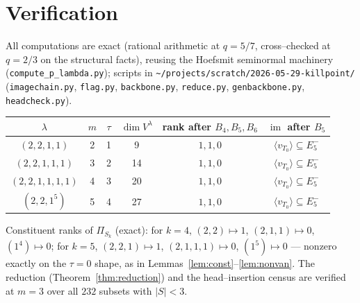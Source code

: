 \documentclass[11pt]{article}
\theoremstyle{definition}
\DeclareMathOperator{\im}{im}
\newcommand{\la}{\lambda}
\newcommand{\Vl}{V^{\la}}
\newcommand{\Em}[1]{E^{-}_{#1}}
\begin{document}
\section{Verification}

All computations are exact (rational arithmetic at $q=5/7$, cross--checked at $q=2/3$ on
the structural facts), reusing the Hoefsmit seminormal machinery
(\texttt{compute\_p\_lambda.py}); scripts in
\texttt{\~{}/projects/scratch/2026-05-29-killpoint/}
(\texttt{imagechain.py}, \texttt{flag.py}, \texttt{backbone.py}, \texttt{reduce.py},
\texttt{genbackbone.py}, \texttt{headcheck.py}).

\begin{center}
\begin{tabular}{c|c|c|c|c|c}
$\la$ & $m$ & $\tau$ & $\dim\Vl$ & rank after $B_4,B_5,B_6$ & $\im$ after $B_5$\\\hline
$(2,2,1,1)$       & 2 & 1 & 9  & $1,1,0$ & $\langle v_{T_0}\rangle\subseteq\Em5$\\
$(2,2,1,1,1)$     & 3 & 2 & 14 & $1,1,0$ & $\langle v_{T_0}\rangle\subseteq\Em5$\\
$(2,2,1,1,1,1)$   & 4 & 3 & 20 & $1,1,0$ & $\langle v_{T_0}\rangle\subseteq\Em5$\\
$(2,2,1^5)$       & 5 & 4 & 27 & $1,1,0$ & $\langle v_{T_0}\rangle\subseteq\Em5$\\
\end{tabular}
\end{center}

\noindent Constituent ranks of $\Pi_{S_k}$ (exact): for $k=4$,
$(2,2)\!\mapsto\!1$, $(2,1,1)\!\mapsto\!0$, $(1^4)\!\mapsto\!0$; for $k=5$,
$(2,2,1)\!\mapsto\!1$, $(2,1,1,1)\!\mapsto\!0$, $(1^5)\!\mapsto\!0$ --- nonzero exactly on
the $\tau=0$ shape, as in Lemmas~\ref{lem:const}--\ref{lem:nonvan}. The reduction
(Theorem~\ref{thm:reduction}) and the head--insertion census are verified at $m=3$ over all
$232$ subsets with $|S|<3$.
\end{document}
